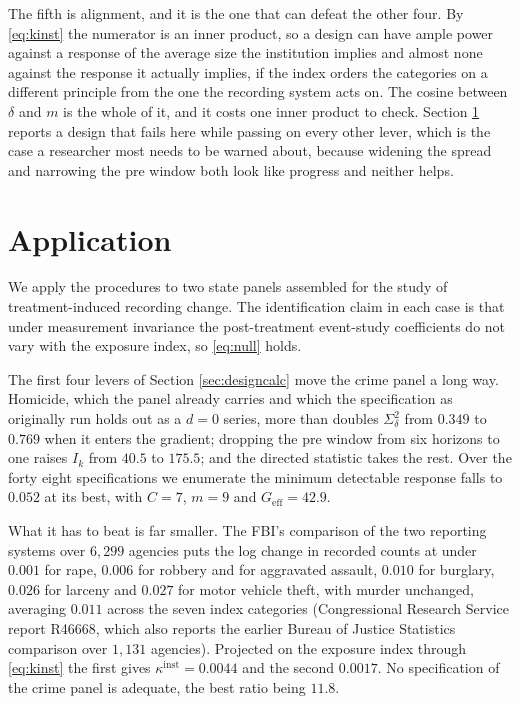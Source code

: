 \documentclass[12pt]{article}
\theoremstyle{definition}
\numberwithin{equation}{section}
\begin{document}
The fifth is alignment, and it is the one that can defeat the other four. By
\eqref{eq:kinst} the numerator is an inner product, so a design can have ample
power against a response of the average size the institution implies and almost
none against the response it actually implies, if the index orders the
categories on a different principle from the one the recording system acts on.
The cosine between $\delta$ and $m$ is the whole of it, and it costs one inner
product to check. Section \ref{sec:app} reports a design that fails here while
passing on every other lever, which is the case a researcher most needs to be
warned about, because widening the spread and narrowing the pre window both
look like progress and neither helps.

\section{Application}
\label{sec:app}

We apply the procedures to two state panels assembled for the study of
treatment-induced recording change. The identification claim in each case is
that under measurement invariance the post-treatment event-study coefficients do
not vary with the exposure index, so \eqref{eq:null} holds.

The first four levers of Section \ref{sec:designcalc} move the crime panel a
long way. Homicide, which the panel already carries and which the specification
as originally run holds out as a $d = 0$ series, more than doubles
$\Sigma_\delta^2$ from $0.349$ to $0.769$ when it enters the gradient; dropping
the pre window from six horizons to one raises $I_k$ from $40.5$ to $175.5$; and
the directed statistic takes the rest. Over the forty eight specifications we
enumerate the minimum detectable response falls to $0.052$ at its best, with
$C = 7$, $m = 9$ and $G_{\mathrm{eff}} = 42.9$.

What it has to beat is far smaller. The FBI's comparison of the two reporting
systems over $6{,}299$ agencies puts the log change in recorded counts at under
$0.001$ for rape, $0.006$ for robbery and for aggravated assault, $0.010$ for
burglary, $0.026$ for larceny and $0.027$ for motor vehicle theft, with murder
unchanged, averaging $0.011$ across the seven index categories (Congressional
Research Service report R46668, which also reports the earlier Bureau of Justice
Statistics comparison over $1{,}131$ agencies). Projected on the exposure index
through \eqref{eq:kinst} the first gives $\kappa^{\mathrm{inst}} = 0.0044$ and
the second $0.0017$. No specification of the crime panel is adequate, the best
ratio being $11.8$.
\end{document}
